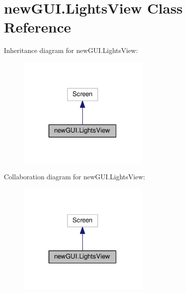 \hypertarget{classnewGUI_1_1LightsView}{}\section{new\+G\+U\+I.\+Lights\+View Class Reference}
\label{classnewGUI_1_1LightsView}


Inheritance diagram for new\+G\+U\+I.\+Lights\+View\+:
\nopagebreak
\begin{figure}[H]
\begin{center}
\leavevmode
\includegraphics[width=184pt]{classnewGUI_1_1LightsView__inherit__graph}
\end{center}
\end{figure}


Collaboration diagram for new\+G\+U\+I.\+Lights\+View\+:
\nopagebreak
\begin{figure}[H]
\begin{center}
\leavevmode
\includegraphics[width=184pt]{classnewGUI_1_1LightsView__coll__graph}
\end{center}
\end{figure}
